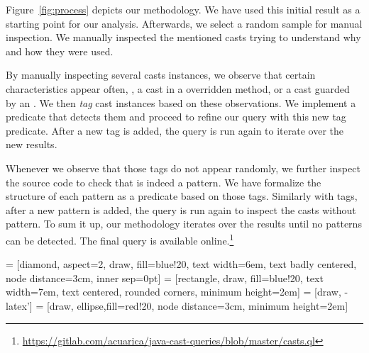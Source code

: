 Figure~\ref{fig:process} depicts our methodology.
We have used this initial result as a starting point for our analysis.
Afterwards, we select a random sample for manual inspection.
We manually inspected the mentioned casts trying to understand why and how they were used.

By manually inspecting several casts instances, we observe that certain characteristics appear often, \eg{}, a cast in a overridden method, or a cast guarded by an .
We then \emph{tag} cast instances based on these observations.
We implement a \ql{} predicate that detects them and proceed to refine our query with this new tag predicate.
After a new tag is added, the query is run again to iterate over the new results.

Whenever we observe that those tags do not appear randomly, we further inspect the source code to check that is indeed a pattern.
We have formalize the structure of each pattern as a \ql{} predicate based on those tags.
Similarly with tags, after a new pattern is added, the query is run again to inspect the casts without pattern.
To sum it up, our methodology iterates over the results until no patterns can be detected.
The final \ql{} query is available online.\footnote{\url{https://gitlab.com/acuarica/java-cast-queries/blob/master/casts.ql}}

 = [diamond, aspect=2, draw, fill=blue!20, 
    text width=6em, text badly centered, node distance=3cm, inner sep=0pt]
 = [rectangle, draw, fill=blue!20, 
    text width=7em, text centered, rounded corners, minimum height=2em]
 = [draw, -latex']
 = [draw, ellipse,fill=red!20, node distance=3cm,
    minimum height=2em]

